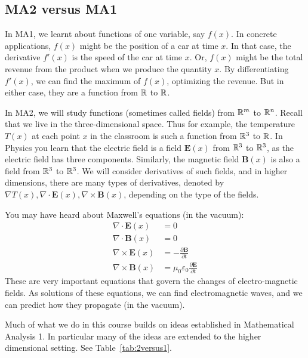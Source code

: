 \subsection*{MA2 versus MA1}
In MA1, we learnt about functions of one variable, say $f(x)$.
In concrete applications, $f(x)$ might be the position of a car at time $x$. In that case, the derivative $f'(x)$ is
the speed of the car at time $x$. Or, $f(x)$ might be the total revenue from the product when we produce the quantity $x$.
By differentiating $f'(x)$, we can find the maximum of $f(x)$, optimizing the revenue.
But in either case, they are a function from $\mathbb{R}$ to $\mathbb{R}$.

In MA2, we will study functions (sometimes called fields) from $\mathbb{R}^m$ to $\mathbb{R}^n$.
Recall that we live in the three-dimensional space. Thus for example,
the temperature $T(x)$ at each point $x$ in the classroom is such a function from $\mathbb{R}^3$ to $\mathbb{R}$.
In Physics you learn that the electric field is a field $\mathbf{E}(x)$ from $\mathbb{R}^3$ to $\mathbb{R}^3$,
as the electric field has three components. Similarly, the magnetic field $\mathbf{B}(x)$ is also a field from $\mathbb{R}^3$ to $\mathbb{R}^3$.
We will consider derivatives of such fields, and in higher dimensions, there are many types of derivatives,
denoted by $\nabla T(x), \nabla \cdot \mathbf{E}(x), \nabla \times \mathbf{B}(x)$, depending on the type of the fields.

You may have heard about Maxwell's equations (in the vacuum):
\begin{align*}
 \nabla \cdot \mathbf{E}(x) &= 0 \\
 \nabla \cdot \mathbf{B}(x) &= 0 \\
 \nabla \times \mathbf{E}(x) &= -\frac{\partial \mathbf{B}}{\partial t} \\
 \nabla \times \mathbf{B}(x) &= \mu_0\varepsilon_0 \frac{\partial \mathbf{E}}{\partial t}
\end{align*}
These are very important equations that govern the changes of electro-magnetic fields.
As solutions of these equations, we can find electromagnetic waves, and we can predict how they propagate (in the vacuum).


Much of what we do in this course builds on ideas established in Mathematical Analysis 1.
In particular many of the ideas are extended to the higher dimensional setting. See Table~\ref{tab:2versus1}.

